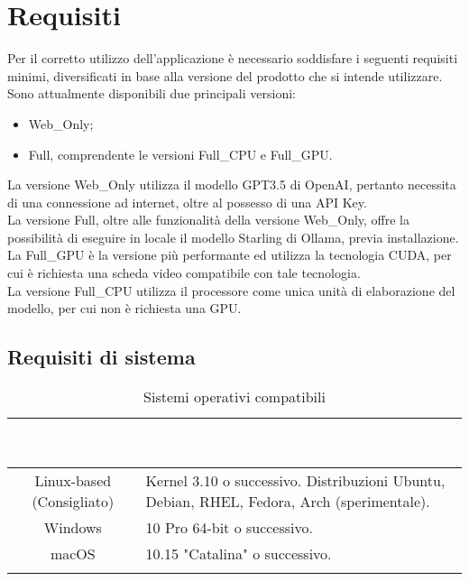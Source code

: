 \chapter{Requisiti} \label{cap:Req}
Per il corretto utilizzo dell'applicazione è necessario soddisfare i seguenti requisiti minimi, diversificati in base alla versione del prodotto che si intende utilizzare.\\
Sono attualmente disponibili due principali versioni:
\vspace{-0.3cm}
\begin{itemize}[itemsep=-2pt]
    \item Web\_Only;
    \item Full, comprendente le versioni Full\_CPU e Full\_GPU.
\end{itemize}
\vspace{-0.3cm}
La versione Web\_Only utilizza il modello GPT3.5 di OpenAI, pertanto necessita di una connessione ad internet, oltre al possesso di una API Key.\\
La versione Full, oltre alle funzionalità della versione Web\_Only, offre la possibilità di eseguire in locale il modello Starling di Ollama, previa installazione.\\
La Full\_GPU è la versione più performante ed utilizza la tecnologia CUDA, per cui è richiesta una scheda video compatibile con tale tecnologia.\\
La versione Full\_CPU utilizza il processore come unica unità di elaborazione del modello, per cui non è richiesta una GPU.
\section{Requisiti di sistema}
\begingroup
\setlength{\tabcolsep}{10pt}
\renewcommand{\arraystretch}{1.5}
\begin{xltabular}{\textwidth}{| c | X |}
    \hline
     \textbf{\textcolor{white}{Sistema Operativo}} & \textbf{\textcolor{white}{Distribuzione}}\\
    \hline
    \endhead
    Linux-based (Consigliato) & Kernel 3.10 o successivo. Distribuzioni Ubuntu, Debian, RHEL, Fedora, Arch (sperimentale).\\
    \hline
    Windows & 10 Pro 64-bit o successivo.\\
    \hline
    macOS & 10.15 "Catalina" o successivo.\\
    \hline
     \caption{Sistemi operativi compatibili}
    \label{tab:reqso}
\end{xltabular}
\endgroup

